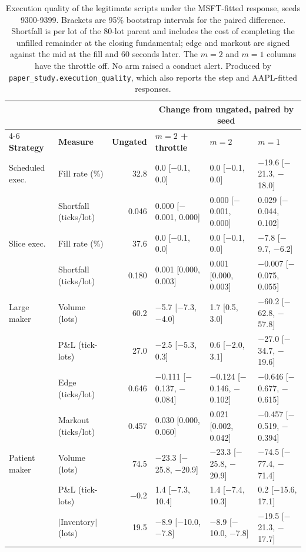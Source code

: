 \documentclass{article}
\begin{document}
\begin{table}[t]
\centering
\footnotesize
\setlength{\tabcolsep}{2pt}
\begin{tabular}{llrlll}
\toprule
& & & \multicolumn{3}{c}{\textbf{Change from ungated, paired by seed}} \\
\cmidrule(lr){4-6}
\textbf{Strategy} & \textbf{Measure} & \textbf{Ungated} & \textbf{$m = 2$ + throttle} & \textbf{$m = 2$} & \textbf{$m = 1$} \\
\midrule
Scheduled exec. & Fill rate (\%) & 32.8 & 0.0 [$-$0.1, 0.0] & 0.0 [$-$0.1, 0.0] & $-$19.6 [$-$21.3, $-$18.0] \\
 & Shortfall (ticks/lot) & 0.046 & 0.000 [$-$0.001, 0.000] & 0.000 [$-$0.001, 0.000] & 0.029 [$-$0.044, 0.102] \\
\addlinespace
Slice exec. & Fill rate (\%) & 37.6 & 0.0 [$-$0.1, 0.0] & 0.0 [$-$0.1, 0.0] & $-$7.8 [$-$9.7, $-$6.2] \\
 & Shortfall (ticks/lot) & 0.180 & 0.001 [0.000, 0.003] & 0.001 [0.000, 0.003] & $-$0.007 [$-$0.075, 0.055] \\
\addlinespace
Large maker & Volume (lots) & 60.2 & $-$5.7 [$-$7.3, $-$4.0] & 1.7 [0.5, 3.0] & $-$60.2 [$-$62.8, $-$57.8] \\
 & P\&L (tick-lots) & 27.0 & $-$2.5 [$-$5.3, 0.3] & 0.6 [$-$2.0, 3.1] & $-$27.0 [$-$34.7, $-$19.6] \\
 & Edge (ticks/lot) & 0.646 & $-$0.111 [$-$0.137, $-$0.084] & $-$0.124 [$-$0.146, $-$0.102] & $-$0.646 [$-$0.677, $-$0.615] \\
 & Markout (ticks/lot) & 0.457 & 0.030 [0.000, 0.060] & 0.021 [0.002, 0.042] & $-$0.457 [$-$0.519, $-$0.394] \\
\addlinespace
Patient maker & Volume (lots) & 74.5 & $-$23.3 [$-$25.8, $-$20.9] & $-$23.3 [$-$25.8, $-$20.9] & $-$74.5 [$-$77.4, $-$71.4] \\
 & P\&L (tick-lots) & $-$0.2 & 1.4 [$-$7.3, 10.4] & 1.4 [$-$7.4, 10.3] & 0.2 [$-$15.6, 17.1] \\
 & $|$Inventory$|$ (lots) & 19.5 & $-$8.9 [$-$10.0, $-$7.8] & $-$8.9 [$-$10.0, $-$7.8] & $-$19.5 [$-$21.3, $-$17.7] \\
\bottomrule
\end{tabular}
\caption{Execution quality of the legitimate scripts under the MSFT-fitted response, seeds 9300-9399. Brackets are 95\% bootstrap intervals for the paired difference. Shortfall is per lot of the 80-lot parent and includes the cost of completing the unfilled remainder at the closing fundamental; edge and markout are signed against the mid at the fill and 60 seconds later. The $m = 2$ and $m = 1$ columns have the throttle off. No arm raised a conduct alert. Produced by \texttt{paper\_study.execution\_quality}, which also reports the step and AAPL-fitted responses.}
\label{tab:execution}
\end{table}
\end{document}
